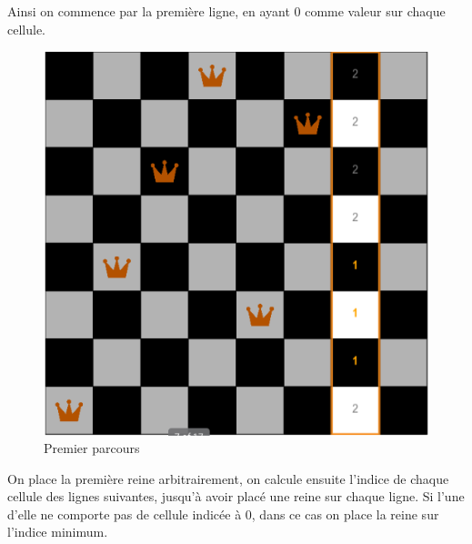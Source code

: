 \documentclass{article}
\begin{document}
Ainsi on commence par la première ligne, en ayant 0 comme valeur sur chaque cellule. 

\clearpage
\begin{figure}[!h]
	\caption{\label{local2} Premier parcours}
	\begin{center}
	\includegraphics[scale=0.3]{./picture/local2.png}
	\end{center}
\end{figure}

On place la première reine arbitrairement, on calcule ensuite l'indice de chaque cellule des lignes suivantes, jusqu'à avoir placé une reine sur chaque ligne. Si l'une d'elle ne comporte pas de cellule indicée à 0, dans ce cas on place la reine sur l'indice minimum. 
\end{document}
